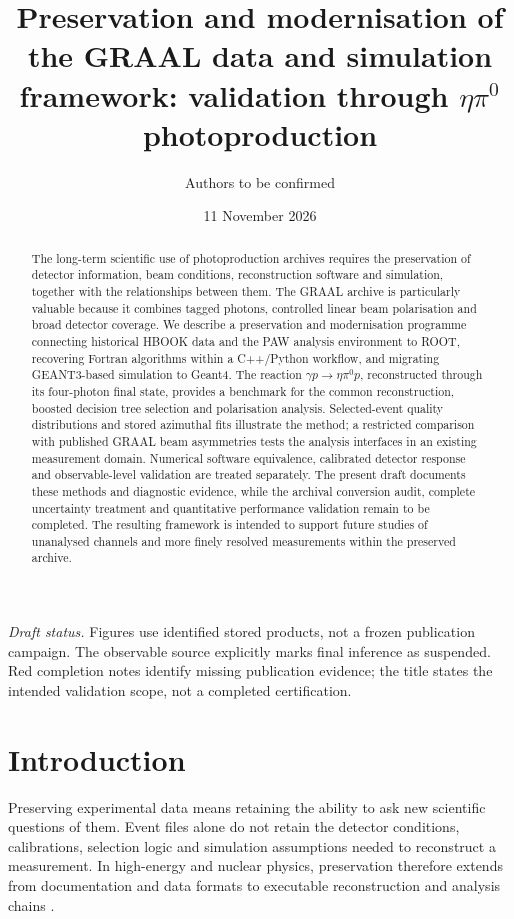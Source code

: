 \documentclass[10pt,aps,prd,amsmath,amssymb,superscriptaddress,twocolumn,nofootinbib,showpacs,showkeys,preprintnumbers,amsfonts,notitlepage,floatfix]{revtex4-2}
\newcommand{\reaction}{\gamma p\rightarrow\eta\pi^0p}
\begin{document}
\title{Preservation and modernisation of the GRAAL data and simulation framework: validation through \texorpdfstring{$\eta\pi^0$}{eta pi0} photoproduction}
\author{Authors to be confirmed}
\date{11 November 2026}
\begin{abstract}
The long-term scientific use of photoproduction archives requires the preservation of detector information, beam conditions, reconstruction software and simulation, together with the relationships between them. The GRAAL archive is particularly valuable because it combines tagged photons, controlled linear beam polarisation and broad detector coverage. We describe a preservation and modernisation programme connecting historical HBOOK data and the PAW analysis environment to ROOT, recovering Fortran algorithms within a C++/Python workflow, and migrating GEANT3-based simulation to Geant4. The reaction $\reaction$, reconstructed through its four-photon final state, provides a benchmark for the common reconstruction, boosted decision tree selection and polarisation analysis. Selected-event quality distributions and stored azimuthal fits illustrate the method; a restricted comparison with published GRAAL beam asymmetries tests the analysis interfaces in an existing measurement domain. Numerical software equivalence, calibrated detector response and observable-level validation are treated separately. The present draft documents these methods and diagnostic evidence, while the archival conversion audit, complete uncertainty treatment and quantitative performance validation remain to be completed. The resulting framework is intended to support future studies of unanalysed channels and more finely resolved measurements within the preserved archive.
\end{abstract}
\maketitle
\raggedbottom
\noindent\textit{Draft status.} Figures use identified stored products, not a frozen publication campaign. The observable source explicitly marks final inference as suspended. Red completion notes identify missing publication evidence; the title states the intended validation scope, not a completed certification.

\section{Introduction}
Preserving experimental data means retaining the ability to ask new scientific questions of them. Event files alone do not retain the detector conditions, calibrations, selection logic and simulation assumptions needed to reconstruct a measurement. In high-energy and nuclear physics, preservation therefore extends from documentation and data formats to executable reconstruction and analysis chains \citep{DPHEP2023}.
\end{document}
